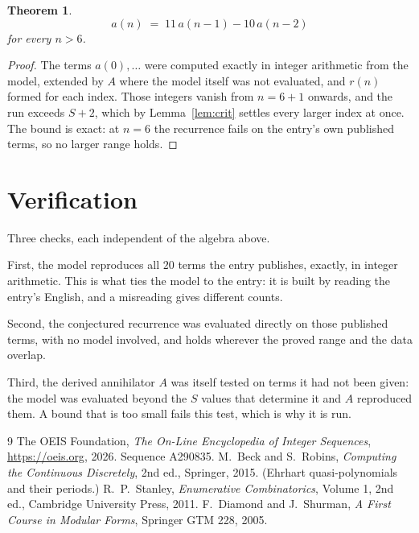 \documentclass[11pt,a4paper]{article}
\theoremstyle{plain}
\newtheorem{theorem}{Theorem}
\theoremstyle{definition}
\begin{document}
\begin{theorem}
\[
a(n)\;=\;11\,a(n-1) - 10\,a(n-2)
\]
for every $n>6$.
\end{theorem}

\begin{proof}
The terms $a(0),\dots$ were computed exactly in integer arithmetic from the model, extended by
$A$ where the model itself was not evaluated, and $r(n)$ formed for each index. Those integers
vanish from $n=6+1$ onwards, and the run exceeds $S+2$, which by
Lemma~\ref{lem:crit} settles every larger index at once. The bound is exact: at $n=6$ the recurrence fails on the entry's own published terms, so no larger range holds.
\end{proof}

\section{Verification}

Three checks, each independent of the algebra above.

First, the model reproduces all $20$ terms the entry publishes, exactly, in integer
arithmetic. This is what ties the model to the entry: it is built by reading the entry's
English, and a misreading gives different counts.

Second, the conjectured recurrence was evaluated directly on those published terms, with no
model involved, and holds wherever the proved range and the data overlap.

Third, the derived annihilator $A$ was itself tested on terms it had not been given: the model
was evaluated beyond the $S$ values that determine it and $A$ reproduced them. A bound that is
too small fails this test, which is why it is run.

\begin{thebibliography}{9}
 The OEIS Foundation, \emph{The On-Line Encyclopedia of Integer
Sequences}, \url{https://oeis.org}, 2026. Sequence A290835.
 M.~Beck and S.~Robins, \emph{Computing the Continuous Discretely},
2nd ed., Springer, 2015. (Ehrhart quasi-polynomials and their periods.)
 R.~P.~Stanley, \emph{Enumerative Combinatorics}, Volume 1, 2nd ed.,
Cambridge University Press, 2011.
 F.~Diamond and J.~Shurman, \emph{A First Course in Modular Forms},
Springer GTM 228, 2005.
\end{thebibliography}
\end{document}

